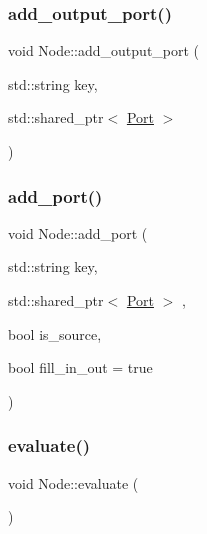 \mbox{\label{class_node_a9df0ba6b43f1b59fd0bce26470b906ba}} 
\subsubsection{\texorpdfstring{add\+\_\+output\+\_\+port()}{add\_output\_port()}}
{\footnotesize\ttfamily void Node\+::add\+\_\+output\+\_\+port (\begin{DoxyParamCaption}\item[{std\+::string}]{key,  }\item[{std\+::shared\+\_\+ptr$<$ \hyperlink{class_port}{Port} $>$}]{ }\end{DoxyParamCaption})}

\mbox{\label{class_node_a139ab3c04753749cc35d2ff8c268c248}} 
\subsubsection{\texorpdfstring{add\+\_\+port()}{add\_port()}}
{\footnotesize\ttfamily void Node\+::add\+\_\+port (\begin{DoxyParamCaption}\item[{std\+::string}]{key,  }\item[{std\+::shared\+\_\+ptr$<$ \hyperlink{class_port}{Port} $>$}]{,  }\item[{bool}]{is\+\_\+source,  }\item[{bool}]{fill\+\_\+in\+\_\+out = {\ttfamily true} }\end{DoxyParamCaption})}

\mbox{\label{class_node_a0a3c8430a9e5b6b725c87bbcf7adc54b}} 
\subsubsection{\texorpdfstring{evaluate()}{evaluate()}}
{\footnotesize\ttfamily void Node\+::evaluate (\begin{DoxyParamCaption}{ }\end{DoxyParamCaption})}

\mbox{\label{class_node_a4ef31790680213bff2306ec34941941c}} 
